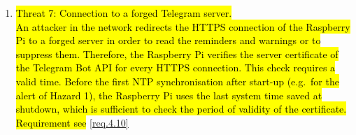 \begin{enumerate}
  \item \hl{Threat 7: Connection to a forged Telegram server.}\\
  \hl{An attacker in the network redirects the HTTPS connection of the Raspberry
  Pi to a forged server in order to read the reminders and warnings or to
  suppress them. Therefore, the Raspberry Pi verifies the server certificate of
  the Telegram Bot API for every HTTPS connection. This check requires a valid
  time. Before the first NTP synchronisation after start-up (e.g.\ for the alert
  of Hazard 1), the Raspberry Pi uses the last system time saved at shutdown,
  which is sufficient to check the period of validity of the certificate.}\\
  \hl{Requirement see} \ref{req.4.10}
\end{enumerate}

